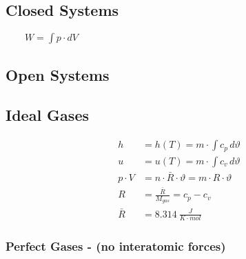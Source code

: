 \subsection{Closed Systems}
    \vspace{4pt}
    \hfill {}  $\qquad W = \int p \cdot dV$

\subsection{Open Systems}
    \vspace{-1em}
\subsection{Ideal Gases}
    \vspace{-1em}
    \begin{align*}
        h &= h(T) = m \cdot \int c_p\, d\vartheta\\
        u &= u(T) = m \cdot \int c_v\, d\vartheta\\
        p \cdot V &= n \cdot \bar{R} \cdot \vartheta = m \cdot R \cdot \vartheta\\
        R &= \frac{\bar{R}}{M_{gas}} = c_p - c_v\\
        \bar{R} &= 8.314~\frac{J}{ K \cdot mol } 
    \end{align*}
    \subsubsection{Perfect Gases - (no interatomic forces)}
        \vspace{-1em}
